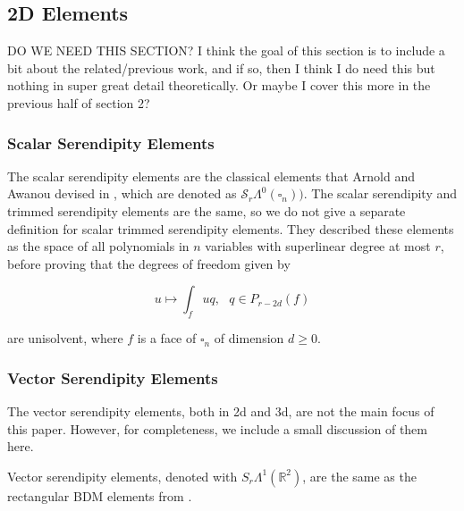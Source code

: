 \documentclass[manuscript,screen]{acmart}
\newcommand{\R}{\mathbb{R}}
\newcommand{\calS}{\mathcal{S}}
\begin{document}
  
  
  
  
  
  
  
  \subsection{2D Elements}
  
  \vspace{0.5in}
  
  DO WE NEED THIS SECTION?  I think the goal of this section is to include a bit about the related/previous work, and if so, then I think I do need this but nothing in super great detail theoretically.  Or maybe I cover this more in the previous half of section 2?
  
  \vspace{0.5in}
  
  \subsubsection{Scalar Serendipity Elements}
  
  The scalar serendipity elements are the classical elements that Arnold and Awanou devised in \cite{arnold2011serendipity}, which are denoted as $\calS_r\Lambda^0(\square_n))$.  The scalar serendipity and trimmed serendipity elements are the same, so we do not give a separate definition for scalar trimmed serendipity elements.  They described these elements as the space of all polynomials in $n$ variables with superlinear degree at most $r$, before proving that the degrees of freedom given by 
  
  \begin{equation*}
      u \mapsto \int_f uq, \text{   } q \in P_{r-2d}(f)
  \end{equation*}
  
  \noindent are unisolvent, where $f$ is a face of $\square_n$ of dimension $d \geq 0$.
  
  
  \subsubsection{Vector Serendipity Elements}
  The vector serendipity elements, both in 2d and 3d, are not the main focus of this paper.  However, for completeness, we include a small discussion of them here.  
  
  Vector serendipity elements, denoted with $S_r \Lambda^1 (\R^2)$, are the same as the rectangular BDM elements from \cite{brezzi1985two}.  
  
\end{document}
